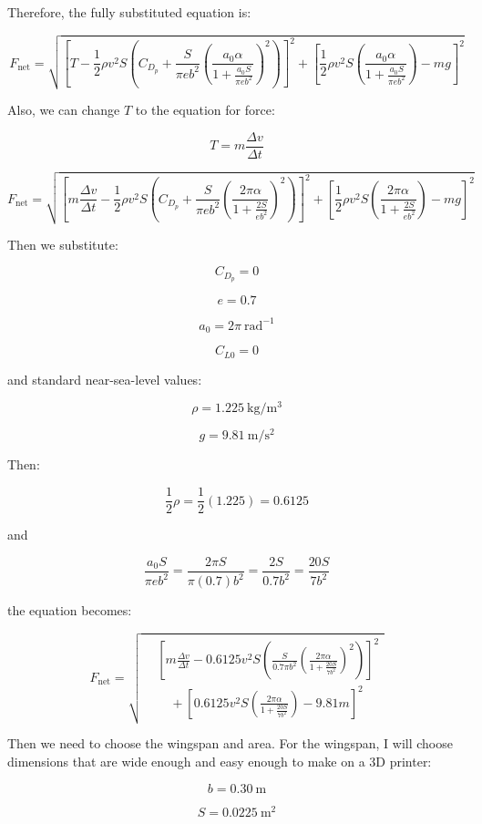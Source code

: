 \documentclass[12pt]{article}
\begin{document}
Therefore, the fully substituted equation is:

\[
F_{\mathrm{net}} =
\sqrt{
\left[
T-
\frac12\rho v^2S
\left(
C_{D_p}
+
\frac{S}{\pi e b^2}
\left(
\frac{a_0\alpha}
{1+\frac{a_0S}{\pi e b^2}}
\right)^2
\right)
\right]^2
+
\left[
\frac12\rho v^2S
\left(
\frac{a_0\alpha}
{1+\frac{a_0S}{\pi e b^2}}
\right)
-mg
\right]^2
}
\]

Also, we can change $T$ to the equation for force:

\[
T=m\frac{\Delta v}{\Delta t}
\]

\[
F_{\mathrm{net}} =
\sqrt{
\left[
m\frac{\Delta v}{\Delta t}
-
\frac12\rho v^2S
\left(
C_{D_p}
+
\frac{S}{\pi e b^2}
\left(
\frac{2\pi\alpha}
{1+\frac{2S}{e b^2}}
\right)^2
\right)
\right]^2
+
\left[
\frac12\rho v^2S
\left(
\frac{2\pi\alpha}
{1+\frac{2S}{e b^2}}
\right)
-mg
\right]^2
}
\]

Then we substitute:

\[
C_{D_p}=0
\]

\[
e=0.7
\]

\[
a_0=2\pi\ \mathrm{rad}^{-1}
\]

\[
C_{L0}=0
\]

and standard near-sea-level values:

\[ 
\rho=1.225\ \mathrm{kg/m^3}
\]

\[
g=9.81\ \mathrm{m/s^2}
\]

Then:

\[
\frac12\rho = \frac12(1.225) = 0.6125
\]

and

\[ 
\frac{a_0S}{\pi e b^2}
=
\frac{2\pi S}{\pi(0.7)b^2}
=
\frac{2S}{0.7b^2}
=
\frac{20S}{7b^2}
\]

the equation becomes:

\[
F_{\mathrm{net}} =
\sqrt{
\begin{aligned}
&
\left[
m\frac{\Delta v}{\Delta t}
-
0.6125v^2S
\left(
\frac{S}{0.7\pi b^2}
\left(
\frac{2\pi\alpha}
{1+\frac{20S}{7b^2}}
\right)^2
\right)
\right]^2
\\[2mm]
&\quad+
\left[
0.6125v^2S
\left(
\frac{2\pi\alpha}
{1+\frac{20S}{7b^2}}
\right)
-9.81m
\right]^2
\end{aligned}
}
\]

Then we need to choose the wingspan and area. For the wingspan, I will choose dimensions that are wide enough and easy enough to make on a 3D printer:

\[
b=0.30\ \mathrm{m}
\]

\[
S=0.0225\ \mathrm{m^2}
\]
\end{document}
